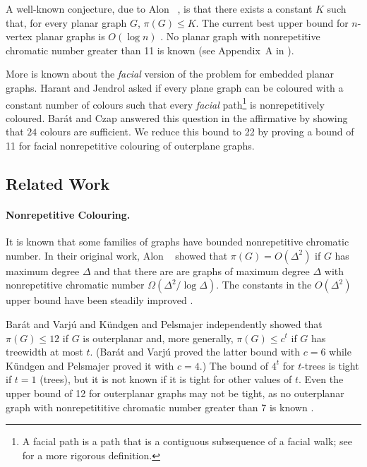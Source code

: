 \documentclass{patmorin}
\begin{document}
A well-known conjecture, due to Alon \etal\ \cite{alon2002nonrepetitive},
is that there exists a constant $K$ such that, for every planar graph
$G$, $\pi(G) \leq K$.  The current best upper bound for $n$-vertex planar
graphs is $O(\log n)$ \cite{dujmovic2012planarlogn}. No planar graph with
nonrepetitive chromatic number greater than 11 is known (see Appendix~A
in \cite{dujmovic2012planarlogn}).

More is known about the \emph{facial} version of the problem for embedded
planar graphs.  Harant and Jendrol \cite{harant2012nonrepetitive} asked
if every plane graph can be coloured with a constant number of colours
such that every \emph{facial} path\footnote{A facial path is a path that
is a contiguous subsequence of a facial walk; see 
for a more rigorous definition.} is nonrepetitively coloured.  Barát and
Czap \cite{barat2013facial} answered this question in the affirmative
by showing that $24$ colours are sufficient.  We reduce this bound
to 22 by proving a bound of 11 for facial nonrepetitive colouring of
outerplane graphs.

\subsection{Related Work}

\paragraph{Nonrepetitive Colouring.}

It is known that some families of graphs have bounded
nonrepetitive chromatic number.  In their original work,
Alon \etal\ \cite{alon2002nonrepetitive} showed that $\pi(G) =
O(\Delta^2)$ if $G$ has maximum degree $\Delta$ and that there
are are graphs of maximum degree $\Delta$ with nonrepetitive
chromatic number $\Omega(\Delta^2/\log \Delta)$.  The constants
in the $O(\Delta^2)$ upper bound have been steadily improved
\cite{dujmovic2011nonrepetitive,grytczuk2007nonrepetitivesurvey,grytczuk2007nonrepetitive,harant2012nonrepetitive}.

Barát and Varjú \cite{barat2007square} and K{\"u}ndgen and Pelsmajer
\cite{kundgen2008nonrepetitive} independently showed that $\pi(G)\le
12$ if $G$ is outerplanar and, more generally, $\pi(G)\le c^t$ if $G$
has treewidth at most $t$.  (Barát and Varjú proved the latter bound
with $c=6$ while K{\"u}ndgen and Pelsmajer proved it with $c=4$.)
The bound of $4^t$ for $t$-trees is tight if $t=1$ (trees), but it
is not known if it is tight for other values of $t$. Even the upper
bound of 12 for outerplanar graphs may not be tight, as no outerplanar
graph with nonrepetititive chromatic number greater than 7 is known
\cite{barat2007square}.
\end{document}
